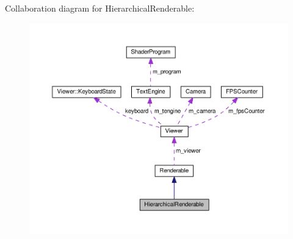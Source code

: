 Collaboration diagram for Hierarchical\+Renderable\+:\nopagebreak
\begin{figure}[H]
\begin{center}
\leavevmode
\includegraphics[width=350pt]{classHierarchicalRenderable__coll__graph}
\end{center}
\end{figure}
